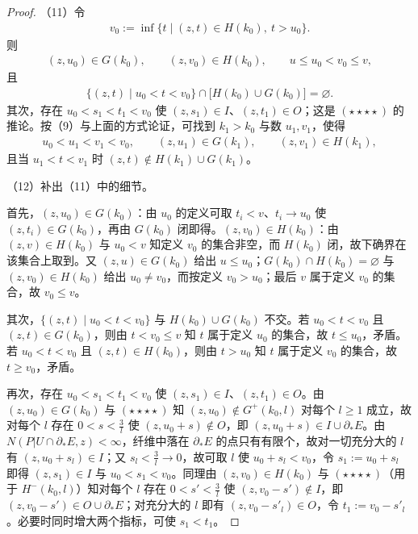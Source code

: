 \documentclass[../../main.tex]{subfiles}%
\begin{document}
\begin{proof}
（11）令
\begin{align*}
v_0:=\inf\{t\mid(z,t)\in H(k_0),\ t>u_0\}.
\end{align*}
则
\begin{align*}
(z,u_0)\in G(k_0),\qquad(z,v_0)\in H(k_0),\qquad u\leqslant u_0<v_0\leqslant v,
\end{align*}
且
\begin{align*}
\{(z,t)\mid u_0<t<v_0\}\cap\bigl[H(k_0)\cup G(k_0)\bigr]=\varnothing .
\end{align*}
其次，存在 $u_0<s_1<t_1<v_0$ 使 $(z,s_1)\in I$、$(z,t_1)\in O$；这是 $(\star\star\star\star)$ 的推论。按（9）与上面的方式论证，可找到 $k_1>k_0$ 与数 $u_1,v_1$，使得
\begin{align*}
u_0<u_1<v_1<v_0,\qquad(z,u_1)\in G(k_1),\qquad(z,v_1)\in H(k_1),
\end{align*}
且当 $u_1<t<v_1$ 时 $(z,t)\notin H(k_1)\cup G(k_1)$。

（12）补出（11）中的细节。

首先，$(z,u_0)\in G(k_0)$：由 $u_0$ 的定义可取 $t_i<v$、$t_i\to u_0$ 使 $(z,t_i)\in G(k_0)$，再由 $G(k_0)$ 闭即得。$(z,v_0)\in H(k_0)$：由 $(z,v)\in H(k_0)$ 与 $u_0<v$ 知定义 $v_0$ 的集合非空，而 $H(k_0)$ 闭，故下确界在该集合上取到。又 $(z,u)\in G(k_0)$ 给出 $u\leqslant u_0$；$G(k_0)\cap H(k_0)=\varnothing$ 与 $(z,v_0)\in H(k_0)$ 给出 $u_0\neq v_0$，而按定义 $v_0>u_0$；最后 $v$ 属于定义 $v_0$ 的集合，故 $v_0\leqslant v$。

其次，$\{(z,t)\mid u_0<t<v_0\}$ 与 $H(k_0)\cup G(k_0)$ 不交。若 $u_0<t<v_0$ 且 $(z,t)\in G(k_0)$，则由 $t<v_0\leqslant v$ 知 $t$ 属于定义 $u_0$ 的集合，故 $t\leqslant u_0$，矛盾。若 $u_0<t<v_0$ 且 $(z,t)\in H(k_0)$，则由 $t>u_0$ 知 $t$ 属于定义 $v_0$ 的集合，故 $t\geqslant v_0$，矛盾。

再次，存在 $u_0<s_1<t_1<v_0$ 使 $(z,s_1)\in I$、$(z,t_1)\in O$。由 $(z,u_0)\in G(k_0)$ 与 $(\star\star\star\star)$ 知 $(z,u_0)\notin G^{+}(k_0,l)$ 对每个 $l\geqslant1$ 成立，故对每个 $l$ 存在 $0<s<\frac3l$ 使 $(z,u_0+s)\notin O$，即 $(z,u_0+s)\in I\cup\partial_*E$。由 $N(P|U\cap\partial_*E,z)<\infty$，纤维中落在 $\partial_*E$ 的点只有有限个，故对一切充分大的 $l$ 有 $(z,u_0+s_l)\in I$；又 $s_l<\frac3l\to0$，故可取 $l$ 使 $u_0+s_l<v_0$，令 $s_1:=u_0+s_l$ 即得 $(z,s_1)\in I$ 与 $u_0<s_1<v_0$。同理由 $(z,v_0)\in H(k_0)$ 与 $(\star\star\star\star)$（用于 $H^{-}(k_0,l)$）知对每个 $l$ 存在 $0<s'<\frac3l$ 使 $(z,v_0-s')\notin I$，即 $(z,v_0-s')\in O\cup\partial_*E$；对充分大的 $l$ 即有 $(z,v_0-s'_l)\in O$，令 $t_1:=v_0-s'_l$。必要时同时增大两个指标，可使 $s_1<t_1$。


\end{proof}
\end{document}
